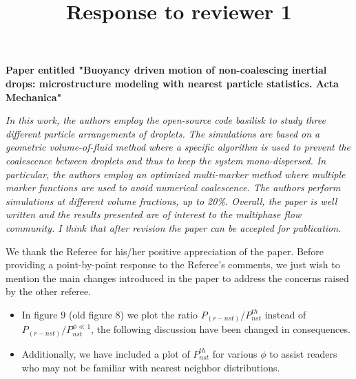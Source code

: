 \documentclass[10pt,a4paper]{article}
\begin{document}
\title{Response to reviewer 1} 
\maketitle
\textbf{Paper entitled "Buoyancy driven motion of non-coalescing inertial drops: microstructure modeling with nearest particle statistics.
Acta Mechanica"}
\bigskip


\textit{In this work, the authors employ the open-source code basilisk to study three different particle arrangements of droplets. The simulations are based on a geometric volume-of-fluid method where a specific algorithm is used to prevent the coalescence between droplets and thus to keep the system mono-dispersed. In particular, the authors employ an optimized multi-marker method where multiple marker functions are used to avoid numerical coalescence. The authors perform simulations at different volume fractions, up to 20\%. Overall, the paper is well written and the results presented are of interest to the multiphase flow community. I think that after revision the paper can be accepted for publication.}


\color{blue}
We thank the Referee for his/her positive appreciation of the paper. 
Before providing a point-by-point response to the Referee’s comments, we just wish to mention the main changes 
introduced in the paper to address the concerns raised by the other referee.
\begin{itemize}
    \item In figure 9 (old figure 8) we plot the ratio $P_{(r-nst)}/P_{nst}^{th}$ instead of $P_{(r-nst)}/P_{nst}^{\phi\ll 1}$, the following discussion have been changed in consequences. 
    \item Additionally, we have included a plot of $P_{nst}^{th}$ for various $\phi$ to assist readers who may not be familiar with nearest neighbor distributions. 
\end{itemize}

\end{document}
